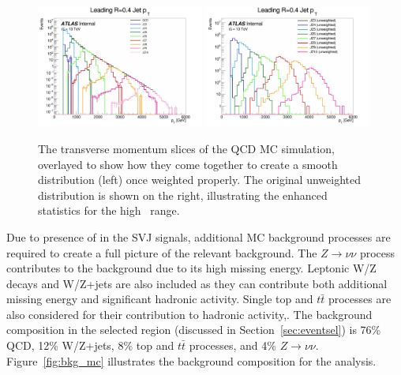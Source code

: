 \begin{figure}
        \centering
	\includegraphics[width=0.49\textwidth]{figures/ch6/jz_slices}
	\includegraphics[width=0.49\textwidth]{figures/ch6/jz_slices_uw}
	\caption{The transverse momentum slices of the QCD MC simulation, overlayed to show how they come together to create a smooth distribution (left) once weighted properly. The original unweighted distribution is shown on the right, illustrating the enhanced statistics for the high \pt~range. 
	\label{fig:jzslices}}
\end{figure}

Due to presence of \met in the SVJ signals, additional MC background processes are required to create a full picture of the relevant background. 
The $Z\rightarrow \nu\nu$ process contributes to the background due to its high missing energy. 
Leptonic W/Z decays and W/Z+jets are also included as they can contribute both additional missing energy and significant hadronic activity.
Single top and $t\bar{t}$ processes are also considered for their contribution to hadronic activity,.
The background composition in the selected region (discussed in Section~\ref{sec:eventsel}) is 76\% QCD, 12\% W/Z+jets, 8\% top and $t\bar{t}$ processes, and 4\% $Z\rightarrow \nu\nu$.  
Figure~\ref{fig:bkg_mc} illustrates the background composition for the analysis.

